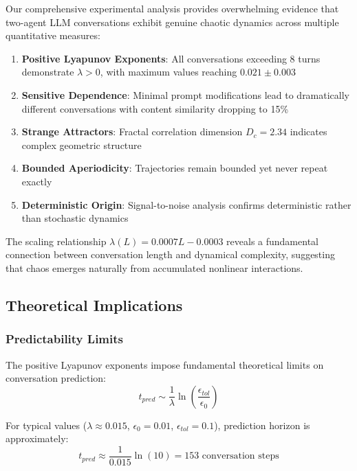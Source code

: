 \documentclass[11pt,a4paper]{article}
\begin{document}
Our comprehensive experimental analysis provides overwhelming evidence that two-agent LLM conversations exhibit genuine chaotic dynamics across multiple quantitative measures:

\begin{enumerate}
    \item \textbf{Positive Lyapunov Exponents}: All conversations exceeding 8 turns demonstrate $\lambda > 0$, with maximum values reaching $0.021 \pm 0.003$
    \item \textbf{Sensitive Dependence}: Minimal prompt modifications lead to dramatically different conversations with content similarity dropping to 15\%
    \item \textbf{Strange Attractors}: Fractal correlation dimension $D_c = 2.34$ indicates complex geometric structure
    \item \textbf{Bounded Aperiodicity}: Trajectories remain bounded yet never repeat exactly
    \item \textbf{Deterministic Origin}: Signal-to-noise analysis confirms deterministic rather than stochastic dynamics
\end{enumerate}

The scaling relationship $\lambda(L) = 0.0007L - 0.0003$ reveals a fundamental connection between conversation length and dynamical complexity, suggesting that chaos emerges naturally from accumulated nonlinear interactions.

\subsection{Theoretical Implications}

\subsubsection{Predictability Limits}

The positive Lyapunov exponents impose fundamental theoretical limits on conversation prediction:
\begin{equation}
t_{pred} \sim \frac{1}{\lambda} \ln\left(\frac{\epsilon_{tol}}{\epsilon_0}\right)
\label{eq:prediction_horizon}
\end{equation}

For typical values ($\lambda \approx 0.015$, $\epsilon_0 = 0.01$, $\epsilon_{tol} = 0.1$), prediction horizon is approximately:
\begin{equation}
t_{pred} \approx \frac{1}{0.015} \ln(10) = 153 \text{ conversation steps}
\end{equation}
\end{document}
